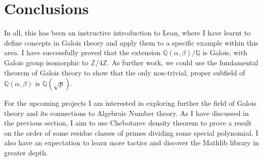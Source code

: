 \documentclass[a4paper,11pt]{article}
\theoremstyle{plain}
\newcommand{\Q}{\ensuremath{\mathbb{Q}}} %
\newcommand{\Z}{\ensuremath{\mathbb{Z}}} %
\begin{document}
	\section{Conclusions}\label{sec:conclu}

	In all, this has been an instructive introduction to Lean, where I have learnt to define concepts in Galois theory and apply them to a specific example within this area. I have successfully proved that the extension $\Q(\alpha,\beta)/\Q$ is Galois, with Galois group isomorphic to $\Z/4\Z$. As further work, we could use the fundamental theorem of Galois theory to show that the only non-trivial, proper subfield of $\Q(\alpha,\beta)$ is $\Q(\sqrt{p})$. 
	
	For the upcoming projects I am interested in exploring further the field of Galois theory and its connections to Algebraic Number theory. As I have discussed in the previous section, I aim to use Chebotarev density theorem to prove a result on the order of some residue classes of primes dividing some special polynomial. I also have an expectation to learn more tactics and discover the Mathlib library in greater depth.
	
	{\small
		
		
	}
		 
\end{document}
